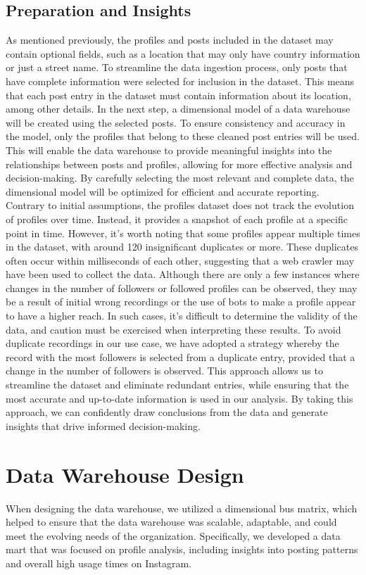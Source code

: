 \documentclass[conference]{IEEEtran}
\begin{document}
\subsection{Preparation and Insights}
As mentioned previously, the profiles and posts included in the dataset may contain optional fields, such as a location that may only have country information or just a street name. To streamline the data ingestion process, only posts that have complete information were selected for inclusion in the dataset. This means that each post entry in the dataset must contain information about its location, among other details.
In the next step, a dimensional model of a data warehouse will be created using the selected posts. To ensure consistency and accuracy in the model, only the profiles that belong to these cleaned post entries will be used. This will enable the data warehouse to provide meaningful insights into the relationships between posts and profiles, allowing for more effective analysis and decision-making. By carefully selecting the most relevant and complete data, the dimensional model will be optimized for efficient and accurate reporting.
Contrary to initial assumptions, the profiles dataset does not track the evolution of profiles over time. Instead, it provides a snapshot of each profile at a specific point in time. However, it's worth noting that some profiles appear multiple times in the dataset, with around 120 insignificant duplicates or more. These duplicates often occur within milliseconds of each other, suggesting that a web crawler may have been used to collect the data.
Although there are only a few instances where changes in the number of followers or followed profiles can be observed, they may be a result of initial wrong recordings or the use of bots to make a profile appear to have a higher reach. In such cases, it's difficult to determine the validity of the data, and caution must be exercised when interpreting these results.
To avoid duplicate recordings in our use case, we have adopted a strategy whereby the record with the most followers is selected from a duplicate entry, provided that a change in the number of followers is observed. This approach allows us to streamline the dataset and eliminate redundant entries, while ensuring that the most accurate and up-to-date information is used in our analysis. By taking this approach, we can confidently draw conclusions from the data and generate insights that drive informed decision-making.

\section{Data Warehouse Design}
When designing the data warehouse, we utilized a dimensional bus matrix, which helped to ensure that the data warehouse was scalable, adaptable, and could meet the evolving needs of the organization. Specifically, we developed a data mart that was focused on profile analysis, including insights into posting patterns and overall high usage times on Instagram.
\\
\end{document}
